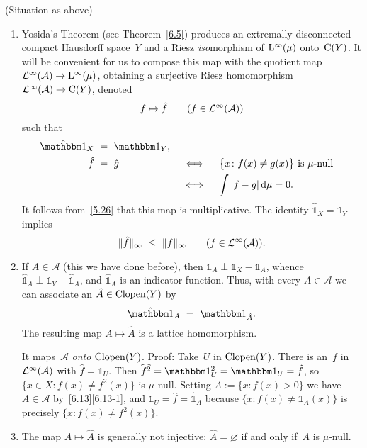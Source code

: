 \documentclass[main.tex]{subfiles}
\begin{document}
\begin{psec}{6.20}%
(Situation as above)
\begin{enumerate}
\item\label{6.20-1}
Yosida's Theorem (see Theorem~\ref{6.5})
produces an extremally disconnected compact Hausdorff space~$Y$
and a Riesz \emph{iso}morphism
of $\mathrm{L}^\infty(\mu)$ onto~$\mathrm{C}(Y)$.
It will be convenient for us
to compose this map with the quotient map
$\mathcal{L}^\infty(\mathcal A)\rightarrow \mathrm{L}^\infty(\mu)$,
obtaining a surjective Riesz homomorphism
$\mathcal{L}^\infty(\mathcal A)\rightarrow\mathrm{C}(Y)$,
denoted
\begin{equation*}
f\mapsto \hat{f}\qquad(f\in\mathcal{L}^\infty(\mathcal A))
\end{equation*}
such that
\begin{alignat*}{2}
\hat{\mathbb{1}}_X\ &=\ \mathbb{1}_Y\htam{,} \\
\hat f \ &=\ \hat g\quad&
&\iff\quad \bigl\{x\colon f(x)\neq g(x)\bigr\}\htam{ is }\mu\htam{-null} \\
&&&\iff\quad \int |f-g|\,\mathrm{d}\mu = 0\htam{.}
\end{alignat*}
It follows from~\ref{5.26}
that this map is multiplicative.
The identity $\hat{\mathbb{1}}_X=\mathbb{1}_Y$ implies
\begin{equation*}
\|\hat{f}\|_\infty\ \leq\ \|f\|_\infty\qquad (f\in\BLeb(\mathcal A))\htam{.}
\end{equation*}
%
\item\label{6.20-2}
If $A\in\mathcal A$
(this we have done before),
then $\mathbb{1}_A \perp \mathbb{1}_X -\mathbb{1}_A$,
whence $\hat{\mathbb{1}}_A \perp \mathbb{1}_Y - \hat{\mathbb{1}}_A$,
and $\hat{\mathbb{1}}_A$ is an indicator function.
Thus,
with every $A\in\mathcal A$
we can associate an $\hat{A}\in\mathrm{Clopen}(Y)$ by
\begin{equation*}
\hat{\mathbb 1}_A\ =\ \mathbb{1}_{\hat A}\htam{.}
\end{equation*}
The resulting map $A\mapsto \hat{A}$ is a lattice homomorphism.

It maps~$\mathcal A$ \emph{onto} $\mathrm{Clopen}(Y)$.
Proof:
Take~$U$ in $\mathrm{Clopen}(Y)$.
There is an~$f$ in~$\mathcal{L}^\infty(\mathcal A)$
with $\hat f=\mathbb{1}_U$.
Then $\smash{\widehat{f^2}}=\mathbb{1}_U^2=\mathbb{1}_U=\hat f$,
so $\{x\in X\colon f(x)\neq f^2(x)\}$ is $\mu$-null.
Setting $A:=\{x\colon f(x)>0\}$
we have $A\in\mathcal A$ by~\ref{6.13}\ref{6.13-1},
and $\mathbb{1}_U = \hat f = \hat{\mathbb{1}}_A$
because $\{x\colon f(x)\neq \mathbb{1}_A(x)\}$
is precisely $\{x\colon f(x)\neq f^2(x)\}$.
%
\item\label{6.20-3}
The map $A\mapsto \hat A$ is generally not injective:
$\hat A=\varnothing$ if and only if~$A$ is $\mu$-null.


\end{enumerate}
\end{psec}
\end{document}
